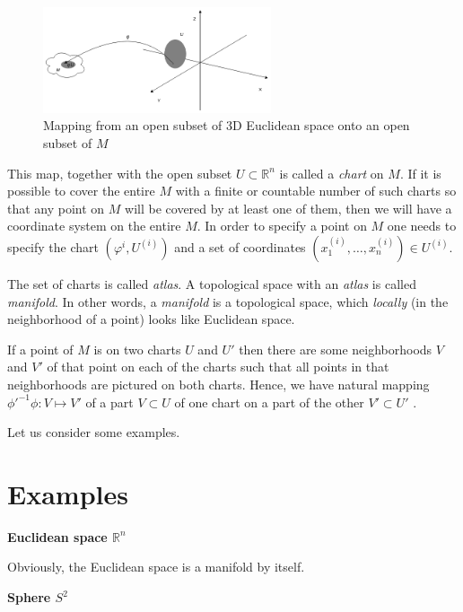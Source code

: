 \documentclass[a4paper,10pt]{article}
\begin{document}
\begin{figure}[h]
\centering
 \includegraphics[width=0.6\textwidth]{../../images/PhiMap.png}
 \caption{Mapping from an open subset of 3D Euclidean space onto an open subset of $M$}
 \label{fig:phimap}
\end{figure}

This map, together with the open subset $U\subset \mathbb{R}^n$ is called a {\it chart} on $M$. If it is possible to cover the entire $M$ with a finite or countable number of such charts so that any point on $M$ will be covered by at least one of them, then we will have a coordinate system on the entire $M$. In order to specify a point on $M$ one needs to specify the chart $(\varphi^i, U^{(i)})$ and a set of coordinates $(x_1^{(i)}, \ldots, x_n^{(i)})\in U^{(i)}$. 

The set of charts is called {\it atlas}. A topological space with an {\it atlas} is called {\it manifold}. 
In other words, a {\it manifold} is a topological space, which { \it locally } (in the neighborhood of a point) looks like Euclidean space. 

If a point of $M$ is on two charts $U$ and $U'$ then there are some neighborhoods $V$ and $V'$ of that point on each of the charts such that all points in that neighborhoods are pictured on both charts. Hence, we have natural mapping $\phi'^{-1}\phi: V\mapsto V'$ of a part $V\subset U$ of one chart on a part of the other $V'\subset U'$ \cite{arn, egh}.

Let us consider some examples.

\section{Examples}


{\bf Euclidean space $\mathbb{R}^n$}
\newline

Obviously, the Euclidean space is a manifold by itself. 
\newline

{\bf Sphere $S^2$}
\newline
\end{document}
